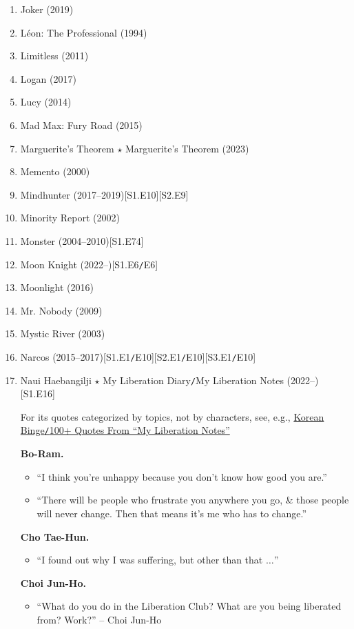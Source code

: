 \documentclass{article}
\begin{document}
\begin{enumerate}
	\item {\sc Joker} (2019)
	\item {\sc L\'eon: The Professional} (1994)
	\item {\sc Limitless} (2011)
	\item {\sc Logan} (2017)
	\item {\sc Lucy} (2014)
	\item {\sc Mad Max: Fury Road} (2015)
	\item Marguerite's Theorem $\star$ Marguerite's Theorem (2023)
	\item {\sc Memento} (2000)
	\item {\sc Mindhunter} (2017--2019)\hfill[S1.E10][S2.E9]
	\item {\sc Minority Report} (2002)
	\item {\sc Monster} (2004--2010)\hfill[S1.E74]
	\item Moon Knight (2022--)\hfill[S1.E6{\tt/}E6]
	\item {\sc Moonlight} (2016)
	\item {\sc Mr. Nobody} (2009)
	\item {\sc Mystic River} (2003)
	\item Narcos (2015--2017)\hfill[S1.E1{\tt/}E10][S2.E1{\tt/}E10][S3.E1{\tt/}E10]
	\item Naui Haebangilji $\star$ My Liberation Diary{\tt/}My Liberation Notes (2022--)\hfill[S1.E16]
	
	For its quotes categorized by topics, not by characters, see, e.g., \href{https://korean-binge.com/2022/04/12/100-quotes-from-my-liberation-notes/}{Korean Binge{\tt/}100+ Quotes From ``My Liberation Notes''}	
	
	{\bf Bo-Ram.}
	\begin{itemize}
		\item ``I think you're unhappy because you don't know how good you are.''
		\item ``There will be people who frustrate you anywhere you go, \& those people will never change. Then that means it's me who has to change.''
	\end{itemize}
	{\bf Cho Tae-Hun.}
	\begin{itemize}
		\item ``I found out why I was suffering, but other than that $\ldots$''
	\end{itemize}
	{\bf Choi Jun-Ho.}
	\begin{itemize}
		\item ``What do you do in the Liberation Club? What are you being liberated from? Work?'' -- Choi Jun-Ho
		

\end{itemize}
\end{enumerate}
\end{document}
